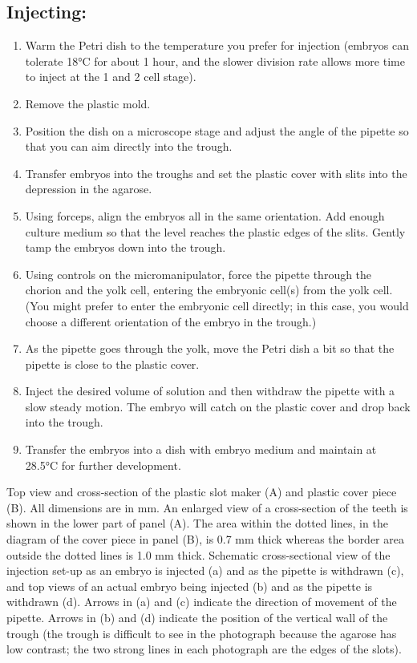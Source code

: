 \documentclass[
]{book}
\providecommand{\tightlist}{%
  \setlength{\itemsep}{0pt}\setlength{\parskip}{0pt}}
\begin{document}
\hypertarget{injecting}{%
\subsection{Injecting:}\label{injecting}}

\begin{enumerate}
\def\labelenumi{\arabic{enumi}.}
\tightlist
\item
  Warm the Petri dish to the temperature you prefer for injection (embryos can tolerate 18°C for about 1 hour, and the slower division rate allows more time to inject at the 1 and 2 cell stage).
\item
  Remove the plastic mold.
\item
  Position the dish on a microscope stage and adjust the angle of the pipette so that you can aim directly into the trough.
\item
  Transfer embryos into the troughs and set the plastic cover with slits into the depression in the agarose.
\item
  Using forceps, align the embryos all in the same orientation. Add enough culture medium so that the level reaches the plastic edges of the slits. Gently tamp the embryos down into the trough.
\item
  Using controls on the micromanipulator, force the pipette through the chorion and the yolk cell, entering the embryonic cell(s) from the yolk cell. (You might prefer to enter the embryonic cell directly; in this case, you would choose a different orientation of the embryo in the trough.)
\item
  As the pipette goes through the yolk, move the Petri dish a bit so that the pipette is close to the plastic cover.
\item
  Inject the desired volume of solution and then withdraw the pipette with a slow steady motion. The embryo will catch on the plastic cover and drop back into the trough.
\item
  Transfer the embryos into a dish with embryo medium and maintain at 28.5°C for further development.
\end{enumerate}

Top view and cross-section of the plastic slot maker (A) and plastic cover piece (B). All dimensions are in mm. An enlarged view of a cross-section of the teeth is shown in the lower part of panel (A). The area within the dotted lines, in the diagram of the cover piece in panel (B), is 0.7 mm thick whereas the border area outside the dotted lines is 1.0 mm thick.
Schematic cross-sectional view of the injection set-up as an embryo is injected (a) and as the pipette is withdrawn (c), and top views of an actual embryo being injected (b) and as the pipette is withdrawn (d). Arrows in (a) and (c) indicate the direction of movement of the pipette. Arrows in (b) and (d) indicate the position of the vertical wall of the trough (the trough is difficult to see in the photograph because the agarose has low contrast; the two strong lines in each photograph are the edges of the slots).
\end{document}

